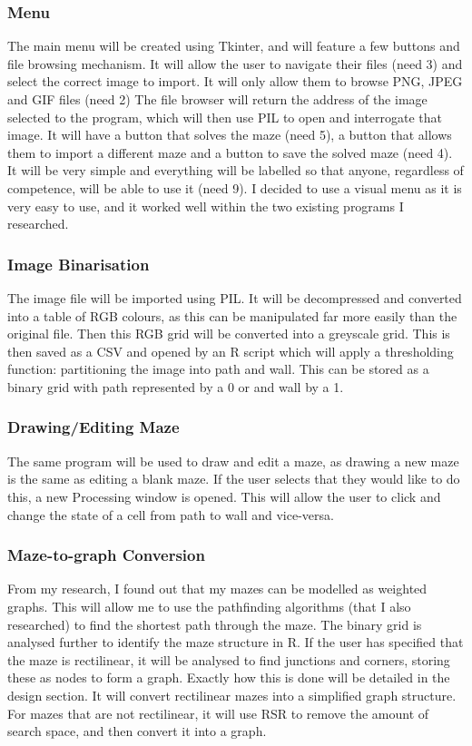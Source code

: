 \documentclass[titlepage]{article}
\begin{document}
\subsubsection{Menu}
The main menu will be created using Tkinter, and will feature a few buttons and file browsing mechanism. It will allow the user to navigate their files (need 3) and select the correct image to import. It will only allow them to browse PNG, JPEG and GIF files (need 2) The file browser will return the address of the image selected to the program, which will then use PIL to open and interrogate that image. It will have a button that solves the maze (need 5), a button that allows them to import a different maze and a button to save the solved maze (need 4). It will be very simple and everything will be labelled so that anyone, regardless of competence, will be able to use it (need 9). I decided to use a visual menu as it is very easy to use, and it worked well within the two existing programs I researched.

\subsubsection{Image Binarisation}
The image file will be imported using PIL. It will be decompressed and converted into a table of RGB colours, as this can be manipulated far more easily than the original file. Then this RGB grid will be converted into a greyscale grid. This is then saved as a CSV and opened by an R script which will apply a thresholding function: partitioning the image into path and wall. This can be stored as a binary grid with path represented by a 0 or and wall by a 1. 

\subsubsection{Drawing/Editing Maze}
The same program will be used to draw and edit a maze, as drawing a new maze is the same as editing a blank maze. If the user selects that they would like to do this, a new Processing window is opened. This will allow the user to click and change the state of a cell from path to wall and vice-versa.  

\subsubsection{Maze-to-graph Conversion}
From my research, I found out that my mazes can be modelled as weighted graphs. This will allow me to use the pathfinding algorithms (that I also researched) to find the shortest path through the maze. The binary grid is analysed further to identify the maze structure in R. If the user has specified that the maze is rectilinear, it will be analysed to find junctions and corners, storing these as nodes to form a graph. Exactly how this is done will be detailed in the design section. It will convert rectilinear mazes into a simplified graph structure. For mazes that are not rectilinear, it will use RSR to remove the amount of search space, and then convert it into a graph. 
\end{document}
